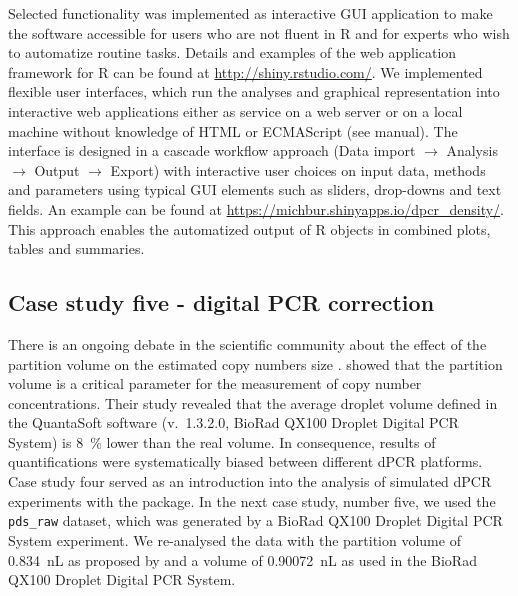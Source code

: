 Selected functionality was implemented as interactive  GUI 
application to make the software accessible for users who are not fluent in R 
and for experts who wish to automatize routine tasks. Details and examples of 
the  web application framework for R can be found at 
\url{http://shiny.rstudio.com/}. We implemented flexible user interfaces, which 
run the analyses and graphical representation into interactive web applications 
either as service on a web server or on a local machine without knowledge of 
HTML or ECMAScript (see  manual). The interface is designed in a 
cascade workflow approach (Data import $\rightarrow$ Analysis $\rightarrow$ 
Output $\rightarrow$ Export) with interactive user choices on input data, 
methods and parameters using typical GUI elements such as sliders, drop-downs 
and text fields. An example can be found at 
\url{https://michbur.shinyapps.io/dpcr_density/}. This approach enables the 
automatized output of R objects in combined plots, tables and summaries.

\subsection{Case study five - digital PCR correction}

There is an ongoing debate in the scientific community about the effect of the 
partition volume on the estimated copy numbers size 
\citep{huggett_clinchem_2014, corbisier_2015, majumdar_2015}. 
\citet{corbisier_2015} showed that the partition volume is a critical parameter 
for the measurement of copy number concentrations. Their study revealed that the 
average droplet volume defined in the QuantaSoft software (v.~1.3.2.0, BioRad 
QX100 Droplet Digital PCR System) is 8~\% lower than the real volume. In 
consequence, results of quantifications were systematically biased between 
different dPCR platforms. Case study four served as an introduction into the 
analysis of simulated dPCR experiments with the  package. In the 
next case study, number five, we used the \texttt{pds\_raw} dataset, which was 
generated by a BioRad QX100 Droplet Digital PCR System experiment. We 
re-analysed the data with the partition volume of 0.834~nL as proposed by 
\citet{corbisier_2015} and a volume of 0.90072~nL as used in the BioRad QX100 
Droplet Digital PCR System.

